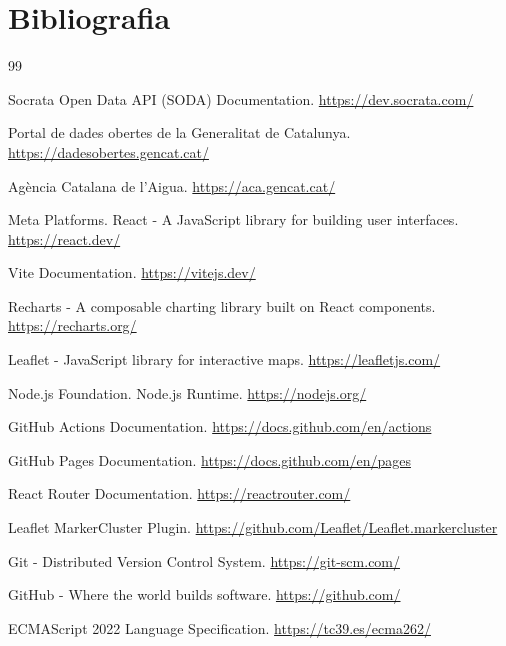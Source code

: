 

\clearpage
\chapter{Bibliografia}
\label{Ch:Bibliography}

\begin{thebibliography}{99}

 Socrata Open Data API (SODA) Documentation. \url{https://dev.socrata.com/}

 Portal de dades obertes de la Generalitat de Catalunya. \url{https://dadesobertes.gencat.cat/}

 Agència Catalana de l'Aigua. \url{https://aca.gencat.cat/}

 Meta Platforms. React - A JavaScript library for building user interfaces. \url{https://react.dev/}

 Vite Documentation. \url{https://vitejs.dev/}

 Recharts - A composable charting library built on React components. \url{https://recharts.org/}

 Leaflet - JavaScript library for interactive maps. \url{https://leafletjs.com/}

 Node.js Foundation. Node.js Runtime. \url{https://nodejs.org/}

 GitHub Actions Documentation. \url{https://docs.github.com/en/actions}

 GitHub Pages Documentation. \url{https://docs.github.com/en/pages}

 React Router Documentation. \url{https://reactrouter.com/}

 Leaflet MarkerCluster Plugin. \url{https://github.com/Leaflet/Leaflet.markercluster}

 Git - Distributed Version Control System. \url{https://git-scm.com/}

 GitHub - Where the world builds software. \url{https://github.com/}

 ECMAScript 2022 Language Specification. \url{https://tc39.es/ecma262/}


\end{thebibliography}
